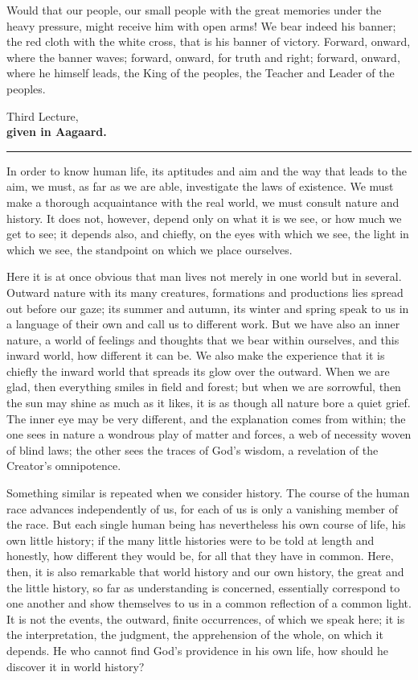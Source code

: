 \documentclass[12pt,a4paper,openany]{book}
\newcommand{\opage}[1]{\marginnote{\footnotesize\textit{[#1]}}}
\newcounter{lect}
\newcommand{\lecture}[2]{\clearpage\stepcounter{lect}\phantomsection\addcontentsline{toc}{chapter}{#1 \csname lecturetitle\arabic{lect}\endcsname}\begin{center}{\large #1}\\[0.4em]{\normalsize\bfseries #2}\\[0.4em]\rule{3em}{0.4pt}\end{center}\medskip\noindent\ignorespaces}
\begin{document}
Would that our people, our small people with the great memories under the heavy pressure, might receive him with open arms! We bear indeed his banner; the red cloth with the white cross, that is his banner of victory. Forward, onward, where the banner waves; forward, onward, for truth and right; forward, onward, where he himself leads, the King of the peoples, the Teacher and Leader of the peoples.

\setcounter{footnote}{0}%
\lecture{Third Lecture,} {given in Aagaard.}
\opage{35}In order to know human life, its aptitudes and aim and the
way that leads to the aim, we must, as far as we are able,
investigate the laws of existence. We must make a
thorough acquaintance with the real world,
we must consult nature and history. It does not, however,
depend only on what it is we see, or how much
we get to see; it depends also, and chiefly,
on the eyes with which we see, the light
in which we see, the standpoint on which we place ourselves.

Here it is at once obvious that man
lives not merely in one world but in several. Outward
nature with its many creatures, formations and productions
lies spread out before our gaze; its summer
and autumn, its winter and spring speak to us in a language
of their own and call us to different work. But we
have also an inner nature, a world of feelings
and thoughts that we bear within ourselves, and this inward world,
how different it can be. We also make
the experience that it is chiefly the inward
world that spreads its glow over the outward.
When we are glad, then everything smiles in field and
\setcounter{footnote}{0}%
\opage{36}forest; but when we are sorrowful, then the sun may shine as
much as it likes, it is as though all nature bore a
quiet grief. The inner eye may be very different,
and the explanation comes from within; the one sees
in nature a wondrous play of matter and forces,
a web of necessity woven of blind laws; the other sees
the traces of God's wisdom, a revelation of the Creator's
omnipotence.

Something similar is repeated when we consider
history. The course of the human race advances
independently of us, for each of us is only a vanishing
member of the race. But each single human being
has nevertheless his own course of life, his own little history; if
the many little histories were to be told at length and honestly,
how different they would be, for all that they have in common.
Here, then, it is also remarkable that world history
and our own history, the great and the
little history, so far as understanding is concerned, essentially correspond
to one another and show themselves to us in a common reflection of
a common light. It is not the events, the outward,
finite occurrences, of which we speak here; it is the interpretation,
the judgment, the apprehension of the whole, on which it
depends. He who cannot find God's providence in
his own life, how should he discover it in
world history?
\end{document}
